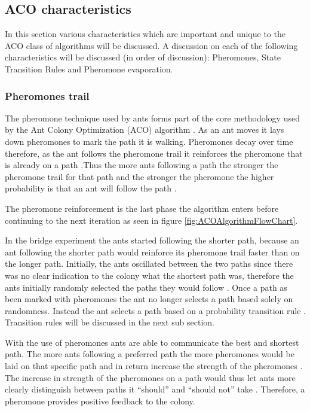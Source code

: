 \subsection{ACO characteristics}
\label{sec:ACOcharacter}
In this section various characteristics which are important and unique to the ACO class of algorithms will be discussed. A discussion on each of the following characteristics will be discussed (in order of discussion): Pheromones, State Transition Rules and Pheromone evaporation.
\subsubsection{Pheromones trail}
\label{sec:pheromonetrail}
The pheromone technique used by ants forms part of the core methodology used by the Ant Colony Optimization (ACO) algorithm \cite{AntQAP}. As an ant moves it lays down pheromones to mark the path it is walking. Pheromones decay over time therefore, as the ant follows the pheromone trail it reinforces the pheromone that is already on a path \cite{AntQAP}.Thus the more ants following a path the stronger the pheromone trail for that path and the stronger the pheromone the higher probability is that an ant will follow the path \cite{AntQAP}. 

The pheromone reinforcement is the last phase the algorithm enters before continuing to the next iteration as seen in figure \ref{fig:ACOAlgorithmFlowChart}.

In the bridge experiment the ants started following the shorter path, because an ant following the shorter path would reinforce its pheromone trail faster than on the longer path. Initially, the ants oscillated between the two paths since there was no clear indication to the colony what the shortest path was, therefore the ants initially randomly selected the paths they would follow \cite{AntQAP}. Once a path as been marked with pheromones the ant no longer selects a path based solely on randomness. Instead the ant selects a path based on a probability transition rule \cite{AntsAndStigmergy}. Transition rules will be discussed in the next sub section.

With the use of pheromones ants are able to communicate the best and shortest path. The more ants following a preferred path the more pheromones would be laid on that specific path and in return increase the strength of the pheromones \cite{ImpACOComplex}. The increase in strength of the pheromones on a path would thus let ants more clearly distinguish between paths it “should” and “should not” take \cite{ImpACOComplex}. Therefore, a pheromone provides positive feedback to the colony.

